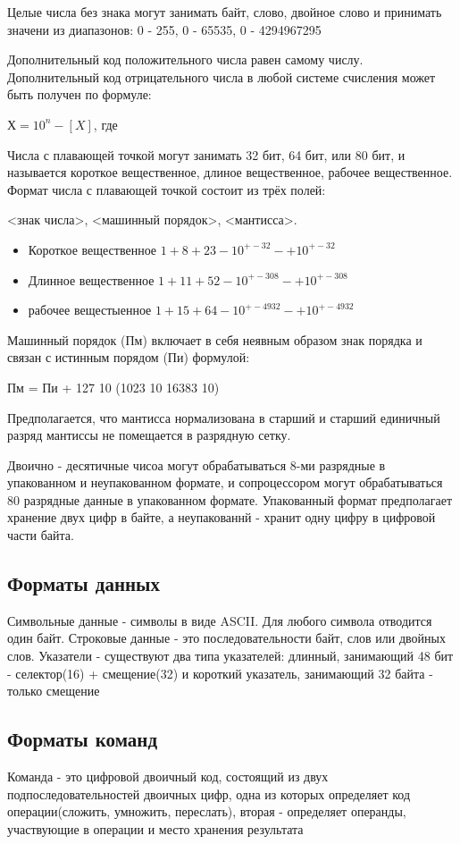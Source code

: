 Целые числа без знака могут занимать байт, слово, двойное слово и принимать значени из диапазонов:
0 - 255, 0 - 65535, 0 - 4294967295

Дополнительный код положительного числа равен самому числу.
Дополнительный код отрицательного числа в любой системе счисления может быть получен по формуле:

$Х = 10^{n} - [X]$, где 




Числа с плавающей точкой могут занимать 32 бит, 64 бит, или 80 бит, и называется короткое вещественное, длиное вещественное, рабочее вещественное. Формат числа с плавающей точкой состоит из трёх полей:

<знак числа>, <машинный порядок>, <мантисса>.
\begin{itemize}
    \item Короткое вещественное $1 + 8 + 23 - 10 ^{+-32} - + 10 ^{+-32}$
    \item Длинное вещественное $1 + 11 + 52 - 10 ^{+-308} - + 10 ^{+-308}$
    \item рабочее вещестыенное $1 + 15 + 64 - 10 ^{+-4932} - + 10 ^{+-4932}$
\end{itemize}

Машинный порядок (Пм) включает в себя неявным образом знак порядка и связан с истинным порядом (Пи) формулой:

Пм = Пи + 127 10 (1023 10 16383 10)

Предполагается, что мантисса нормализована в старший и старший единичный разряд мантиссы не помещается в разрядную сетку.

Двоично - десятичные чисоа могут обрабатываться 8-ми разрядные в упакованном и неупакованном формате, и сопроцессором могут обрабатываться 80 разрядные данные в упакованном формате. Упакованный формат предполагает хранение двух цифр в байте, а неупакованнй - хранит одну цифру в цифровой части байта.

\subsection{Форматы данных}
Символьные данные - символы в виде ASCII. Для любого символа отводится один байт.
Строковые данные - это последовательности байт, слов или двойных слов.
Указатели - существуют два типа указателей: 
длинный, занимающий 48 бит - селектор(16) + смещение(32)
и короткий указатель, занимающий 32 байта - только смещение
\subsection{Форматы команд}
Команда - это цифровой двоичный код, состоящий из двух подпоследовательностей двоичных цифр, одна из которых определяет код операции(сложить, умножить, переслать), вторая - определяет операнды, участвующие в операции и место хранения результата

